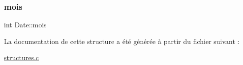 \mbox{\label{structDate_a9ce0f4d74252d7d1bf097ed047fbf880}} 
\subsubsection{\texorpdfstring{mois}{mois}}
{\footnotesize\ttfamily int Date\+::mois}



La documentation de cette structure a été générée à partir du fichier suivant \+:\begin{DoxyCompactItemize}
\item 
\hyperlink{structures_8c}{structures.\+c}\end{DoxyCompactItemize}
